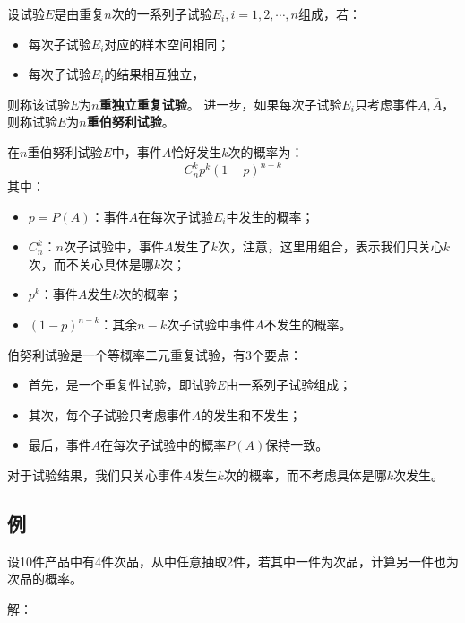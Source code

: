 \begin{definition}[伯努利试验]
设试验$E$是由重复$n$次的一系列子试验$E_i,i=1,2,\cdots ,n$组成，若：
\begin{itemize}
    \item 每次子试验$E_i$对应的样本空间相同；
    \item 每次子试验$E_i$的结果相互独立，
\end{itemize}
则称该试验$E$为{\bf $n$重独立重复试验}。
进一步，如果每次子试验$E_i$只考虑事件$A,\bar{A}$，则称试验$E$为{\bf $n$重伯努利试验}。
\end{definition}

\begin{theorem}
在$n$重伯努利试验$E$中，事件$A$恰好发生$k$次的概率为：
\[
C_{n}^{k}p^k\left( 1-p \right) ^{n-k}
\]
其中：
\begin{itemize}
    \item $p=P\left( A \right) $：事件$A$在每次子试验$E_i$中发生的概率；
    \item $C_{n}^{k}$：$n$次子试验中，事件$A$发生了$k$次，注意，这里用组合，表示我们只关心$k$次，而不关心具体是哪$k$次；
    \item $p^k$：事件$A$发生$k$次的概率；
    \item $\left( 1-p \right) ^{n-k}$：其余$n-k$次子试验中事件$A$不发生的概率。
\end{itemize}
\end{theorem}

伯努利试验是一个等概率二元重复试验，有3个要点：
\begin{itemize}
    \item 首先，是一个重复性试验，即试验$E$由一系列子试验组成；
    \item 其次，每个子试验只考虑事件$A$的发生和不发生；
    \item 最后，事件$A$在每次子试验中的概率$P\left( A\right) $保持一致。
\end{itemize}
对于试验结果，我们只关心事件$A$发生$k$次的概率，而不考虑具体是哪$k$次发生。

\subsection{例}

\begin{example}
设10件产品中有4件次品，从中任意抽取2件，若其中一件为次品，计算另一件也为次品的概率。
\end{example}

解：

